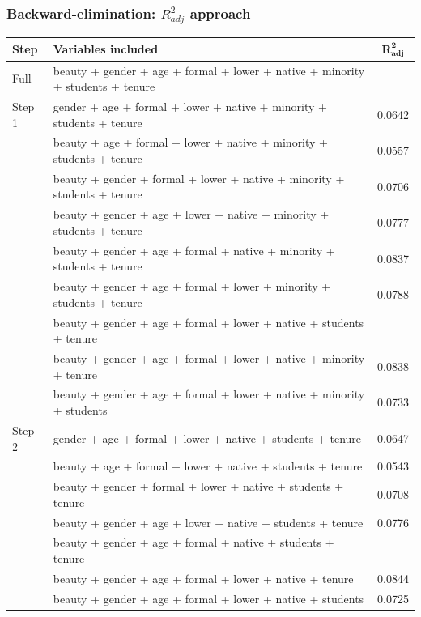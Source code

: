 \begin{frame}[shrink]
\frametitle{Backward-elimination: $R^2_{adj}$ approach}

\vspace{-0.15cm}

{\tiny
\begin{tabular}{l | l | c}
\textbf{Step}		& \textbf{Variables included}	& $\mathbf{R^2_{adj}}$ \\
\hline
Full		& beauty + gender + age + formal + lower + native + minority + students + tenure & \orange{0.0839} \pause \\
\hline
Step 1 	& gender + age + formal + lower + native + minority + students + tenure		& 0.0642 \\
		& beauty + age + formal + lower + native + minority + students + tenure		& 0.0557 \\
		& beauty + gender + formal + lower + native + minority + students + tenure	& 0.0706 \\
		& beauty + gender + age + lower + native + minority + students + tenure		& 0.0777 \\
		& beauty + gender + age + formal + native + minority + students + tenure		& 0.0837 \\
		& beauty + gender + age + formal + lower + minority + students + tenure		& 0.0788 \\
		& beauty + gender + age + formal + lower + native + students + tenure		& \orange{0.0842} \\
		& beauty + gender + age + formal + lower + native + minority + tenure		& 0.0838 \\
		& beauty + gender + age + formal + lower + native + minority + students		& 0.0733 \pause \\
\hline		
Step 2	& gender + age + formal + lower + native + students + tenure 				& 0.0647 \\
		& beauty + age + formal + lower + native + students + tenure 				& 0.0543 \\
		& beauty + gender + formal + lower + native + students + tenure 			& 0.0708 \\
		& beauty + gender + age + lower + native + students + tenure 				&0.0776  \\
		& beauty + gender + age + formal + native + students + tenure 			& \orange{0.0846} \\
		& beauty + gender + age + formal + lower + native + tenure 				& 0.0844 \\
		& beauty + gender + age + formal + lower + native + students 				& 0.0725 \pause \\

\end{tabular}}
\end{frame}
